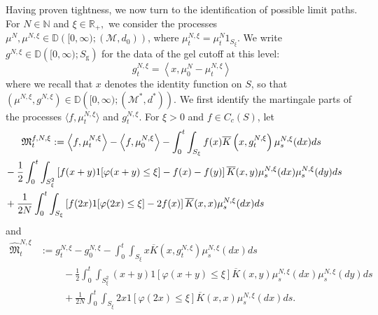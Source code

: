 \documentclass[11pt, notitlepage]{article}
\newcommand{\NN}{\ensuremath{\mathbb{N}}}
\begin{document}
Having proven tightness, we now turn to the identification of possible limit paths. For $N\in\NN$ and $\xi \in \mathbb{R}_+,$ we consider the processes $\mu^N, \mu^{N,\xi} \in \mathbb{D}\left([0,\infty); \left(\mathcal{M}, d_0\right)\right)$, where
$\mu^{N,\xi}_t = \mu^N_t 1_{S_\xi}$. We write $g^{N,\xi} \in \mathbb{D}\left([0,\infty); S_\mathrm{g}\right)$ for the data of the gel cutoff at this level:
\begin{equation}\label{eq: cutoff gel} g^{N,\xi}_t = \left<x, \mu_0^N -\mu^{N,\xi}_t\right>\end{equation} where we recall that $x$ denotes the identity function on $S$, so that
$\left(\mu^{N,\xi}, g^{N,\xi}\right) \in \mathbb{D}\left([0,\infty); \left(\mathcal{M}^\ast, d^\ast\right)\right). $  
We first identify the martingale parts of  the processes $\langle f, \mu^{N,\xi}_t\rangle$ and $g^{N,\xi}_t$.
For $\xi >0$ and $f\in C_c(S)$, let
\begin{equation}\label{eq:mg1} \begin{split}
&\mathfrak{M}_t^{f,N,\xi}:=  \left<f, \mu_t^{N,\xi}\right> - \left<f, \mu_0^{N,\xi}\right> 
- \int_0^t \int_{S_\xi}f(x) \overline{K}\left(x,g^{N,\xi}_t\right)\mu^{N,\xi}_s(d x)d s\\
&\hspace{-0.6cm}- \frac12 \int_0^t \int_{S_\xi^2}\left[f(x+y)1[\varphi(x+y) \leq \xi ] - f(x) - f(y)\right]
      \overline{K}(x,y)\mu^{N,\xi}_s(d x)\mu^{N,\xi}_s(d y) ds \\
     &\hspace{-0.6cm}  + \frac{1}{2N}\int_0^t \int_{S_\xi} \left[f(2x)1[\varphi(2x) \leq \xi ] - 2f(x)\right]\overline{K}(x,x)\mu^{N,\xi}_s(d x) d s
\end{split}\end{equation}
and
\begin{equation}\label{eq:mg2} \begin{split}
\widehat{\mathfrak{M}}_t^{N,\xi} &:= g_t^{N,\xi} - g_0^{N,\xi} 
- \int_0^t \int_{S_\xi}x \overline{K}\left(x,g^{N,\xi}_t\right)\mu^{N,\xi}_s(d x)d s\\& \hspace{1cm}
- \frac12 \int_0^t \int_{S_\xi^2}(x+y)1[\varphi(x+y) \leq \xi ]
      \overline{K}(x,y)\mu^{N,\xi}_s(d x)\mu^{N,\xi}_s(d y) ds \\ &\hspace{1cm}
      + \frac{1}{2N}\int_0^t \int_{S_\xi} 2x 1[\varphi(2x) \leq \xi ]\overline{K}(x,x)\mu^{N,\xi}_s(d x) d s.
\end{split}\end{equation}
\end{document}
